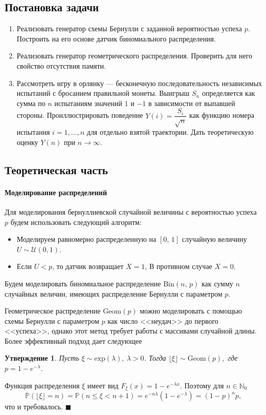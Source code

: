 \documentclass[16pt]{article}
\newtheorem{St}{Утверждение}
\newenvironment{Proof}{\par\noindent{\bf Доказательство.}}{\hfill$\scriptstyle\blacksquare$}
\newcommand{\Prb}{\mathbb{P}}
\begin{document}
\subsection{Постановка задачи}
\begin{enumerate}
	\item  Реализовать генератор схемы Бернулли с заданной вероятностью успеха $p$. Построить на его основе датчик биномиального распределения.
	\item Реализовать генератор геометрического распределения. Проверить для него свойство отсутствия памяти.
	\item Рассмотреть игру в орлянку --- бесконечную последовательность независимых испытаний с бросанием правильной монеты. Выигрыш $S_n$ определяется как сумма по $n$ испытаниям значений $1$ и $-1$ в зависимости от выпавшей стороны. Проиллюстрировать поведение $Y(i) = \dfrac{S_i}{\sqrt{n}}$ как функцию номера испытания $i = 1, \ldots, n$ для отдельно взятой траектории. Дать теоретическую оценку $Y(n)$ при $n \to \infty$.
\end{enumerate}

\subsection{Теоретическая часть}
\paragraph{Моделирование распределений}
Для моделирования бернуллиевской случайной величины с вероятностью успеха $p$ будем использовать следующий алгоритм:
\begin{itemize}
	\item Моделируем равномерно распределенную на $[0,\, 1]$ случайную величину $U \sim \mathcal{U}(0, 1)$.
	\item Если $U < p$, то датчик возвращает $X = 1$, В противном случае $X = 0$.
\end{itemize}

Будем моделировать биномиальное распределение $\mathrm{Bin}(n,\,p)$ как сумму $n$ случайных величин, имеющих распределение Бернулли с параметром $p$.

Геометрическое распределение $\mathrm{Geom}(p)$ можно моделировать с помощью схемы Бернулли с параметром $p$ как число <<неудач>> до первого <<успеха>>, однако этот метод требует работы с массивами случайной длины. Более эффективный подход дает следующее
\begin{St}
Пусть $\xi \sim \mathrm{exp}(\lambda), \ \lambda > 0$. Тогда $\lfloor \xi \rfloor \sim \mathrm{Geom}(p),$ где $p = 1 - e^{-\lambda}$.
\end{St}
\begin{Proof}

Функция распределения $\xi$ имеет вид
$F_\xi(x) = 1 - e^{-\lambda x}$. Поэтому для $n \in \mathbb{N}_0$
$$\Prb(\lfloor \xi \rfloor = n) = \Prb(n \leq \xi < n + 1) = e^{-n\lambda}(1 - e^{-\lambda}) = (1 - p)^np,$$
что и требовалось.
\end{Proof}
\end{document}
